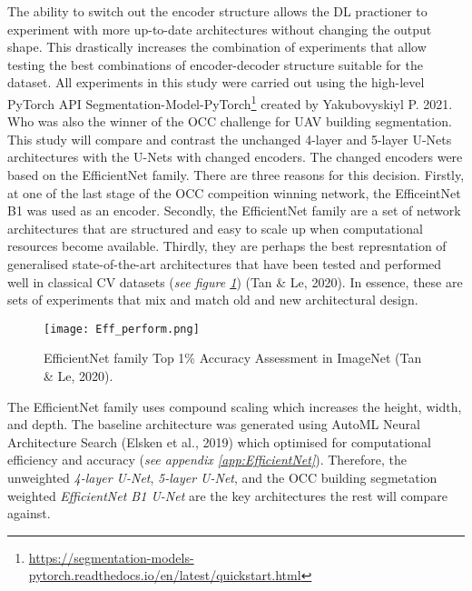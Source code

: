 \documentclass[11pt, a4paper, twoside]{report}
\begin{document}
The ability to switch out the encoder structure allows the DL practioner to experiment with more up-to-date architectures without changing the output shape. This drastically increases the combination of experiments that allow testing the best combinations of encoder-decoder structure suitable for the dataset. All experiments in this study were carried out using the high-level PyTorch API Segmentation-Model-PyTorch\footnote{\url{https://segmentation-models-pytorch.readthedocs.io/en/latest/quickstart.html}} created by Yakubovyskiyl P. 2021. Who was also the winner of the OCC challenge for UAV building segmentation. This study will compare and contrast the unchanged 4-layer and 5-layer U-Nets architectures with the U-Nets with changed encoders. The changed encoders were based on the EfficientNet family. There are three reasons for this decision. Firstly, at one of the last stage of the OCC compeition winning network, the EfficeintNet B1 was used as an encoder. Secondly, the EfficientNet family are a set of network architectures that are structured and easy to scale up when computational resources become available. Thirdly, they are perhaps the best represntation of generalised state-of-the-art architectures that have been tested and performed well in classical CV datasets (\textit{see figure \ref{fig:Eff_perform}}) (Tan \& Le, 2020). In essence, these are sets of experiments that mix and match old and new architectural design.\\\par

\begin{figure}[H]
  \centering
  \texttt{[image: Eff\_perform.png]}
  \caption{EfficientNet family Top 1\% Accuracy Assessment in ImageNet (Tan \& Le, 2020).}
  \label{fig:Eff_perform}
\end{figure}

The EfficientNet family uses compound scaling which increases the height, width, and depth. The baseline architecture was generated using AutoML Neural Architecture Search (Elsken et al., 2019) which optimised for computational efficiency and accuracy (\textit{see appendix \ref{app:EfficientNet}}). Therefore, the unweighted \textit{4-layer U-Net}, \textit{5-layer U-Net}, and the OCC building segmetation weighted \textit{EfficientNet B1 U-Net} are the key architectures the rest will compare against.\\\par
\end{document}
